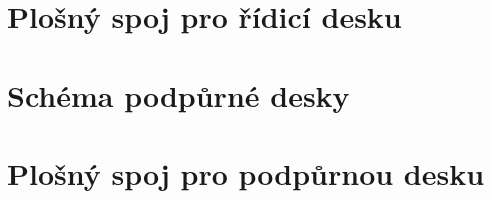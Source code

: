 \chapter{Plošný spoj pro řídicí desku}
	\label{sec:main_board_pcb}
    

\chapter{Schéma podpůrné desky}
	\label{sec:support_board_scheme}
	

\chapter{Plošný spoj pro podpůrnou desku}
	\label{sec:support_board_pcb}
	
